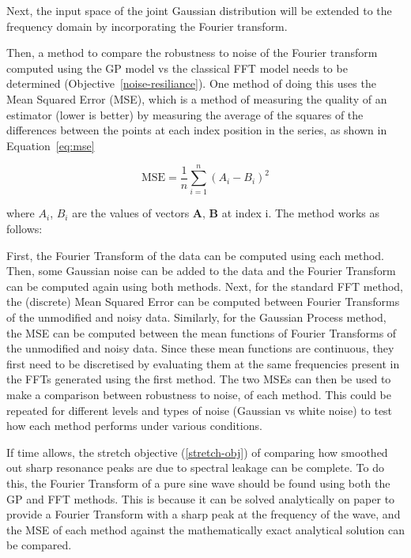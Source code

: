\documentclass[12pt]{article}
\begin{document}
    Next, the input space of the joint Gaussian distribution will be extended to the frequency domain by incorporating the Fourier transform.

    Then, a method to compare the robustness to noise of the Fourier transform computed using the GP model vs the classical FFT model needs to be determined (Objective~\ref{noise-resiliance}).
    One method of doing this uses the Mean Squared Error (MSE), which is a method of measuring the quality of an estimator (lower is better) by measuring the average of the squares of the differences between the points at each index position in the series, as shown in Equation~\ref{eq:mse}

    \begin{equation}
        \text{MSE} = \frac{1}{n} \sum_{i=1}^{n} (A_i - B_i)^2
        \label{eq:mse}
    \end{equation}


    \noindent where $A_i$, $B_i$ are the values of vectors $\mathbf{A}$, $\mathbf{B}$ at index i.
    The method works as follows:

    First, the Fourier Transform of the data can be computed using each method.
    Then, some Gaussian noise can be added to the data and the Fourier Transform can be computed again using both methods.
    Next, for the standard FFT method, the (discrete) Mean Squared Error can be computed between Fourier Transforms of the unmodified and noisy data.
    Similarly, for the Gaussian Process method, the MSE can be computed between the mean functions of Fourier Transforms of the unmodified and noisy data.
    Since these mean functions are continuous, they first need to be discretised by evaluating them at the same frequencies present in the FFTs generated using the first method.
    The two MSEs can then be used to make a comparison between robustness to noise, of each method.
    This could be repeated for different levels and types of noise (Gaussian vs white noise) to test how each method performs under various conditions.

    If time allows, the stretch objective (\ref{stretch-obj}) of comparing how smoothed out sharp resonance peaks are due to spectral leakage can be complete.
    To do this, the Fourier Transform of a pure sine wave should be found using both the GP and FFT methods.
    This is because it can be solved analytically on paper to provide a Fourier Transform with a sharp peak at the frequency of the wave, and the MSE of each method against the mathematically exact analytical solution can be compared.
\end{document}
